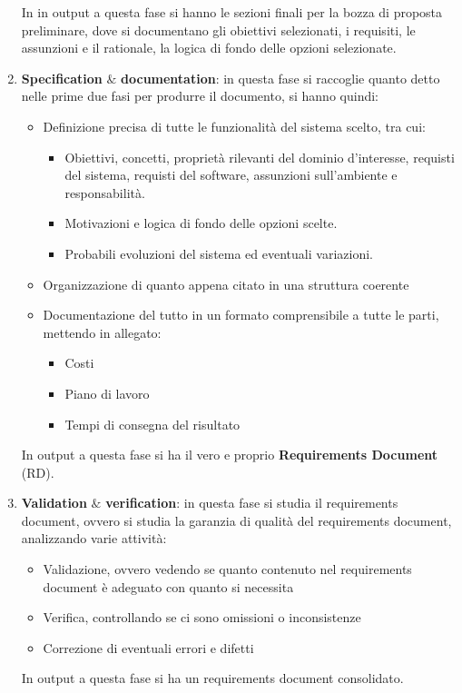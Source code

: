 \begin{enumerate}
          In in output a questa fase si hanno le sezioni finali per la bozza di proposta
          preliminare, dove si documentano gli obiettivi selezionati, i requisiti, le
          assunzioni e il rationale, la logica di fondo delle opzioni selezionate.
    \item \textbf{Specification} $\&$ \textbf{documentation}: in questa fase si
          raccoglie quanto detto nelle prime due fasi per produrre il documento, si hanno quindi:
          \begin{itemize}
              \item Definizione precisa di tutte le funzionalità del sistema scelto,
                    tra cui:
                    \begin{itemize}
                        \item Obiettivi, concetti, proprietà rilevanti del dominio d'interesse,
                              requisti del sistema, requisti del software, assunzioni sull'ambiente
                              e responsabilità.
                        \item Motivazioni e logica di fondo delle opzioni scelte.
                        \item Probabili evoluzioni del sistema ed eventuali variazioni.
                    \end{itemize}
              \item Organizzazione di quanto appena citato in una struttura coerente
              \item Documentazione del tutto in un formato comprensibile a tutte le parti,
                    mettendo in allegato:
                    \begin{itemize}
                        \item Costi
                        \item Piano di lavoro
                        \item Tempi di consegna del risultato
                    \end{itemize}
          \end{itemize}
          In output a questa fase si ha il vero e proprio \textbf{Requirements Document}
          (RD).
    \item \textbf{Validation} $\&$ \textbf{verification}: in questa fase si studia
          il requirements document, ovvero si studia la garanzia di qualità del
          requirements document, analizzando varie attività:
          \begin{itemize}
              \item Validazione, ovvero vedendo se quanto contenuto nel requirements
                    document è adeguato con quanto si necessita
              \item Verifica, controllando se ci sono omissioni o inconsistenze
              \item Correzione di eventuali errori e difetti
          \end{itemize}
          In output a questa fase si ha un requirements document consolidato.
\end{enumerate}

